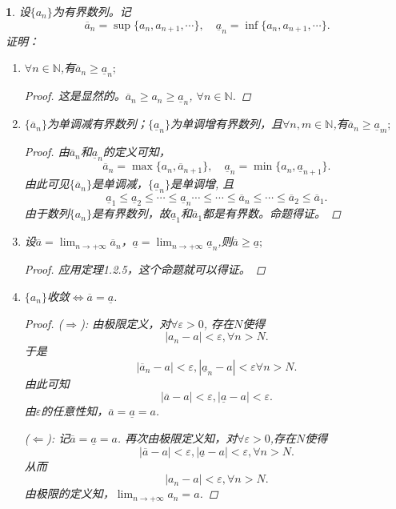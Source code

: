 \documentclass[utf8]{book}
\newtheorem{example}{}[section]             %
\begin{document}
\begin{example}
设$\{a_n\}$为有界数列。记
$$\overline{a}_n = \sup\{a_n, a_{n+1}, \cdots\}, \quad\underline{a}_n= \inf\{a_n, a_{n+1},\cdots\}.$$
证明：
\renewcommand\labelenumi{\normalfont(\theenumi)}
\begin{enumerate}
\item $\forall n\in\mathbb{N}$,有$\overline{a}_n \geq\underline{a}_n;$
\begin{proof}
这是显然的。$\overline{a}_n \geq a_n \geq \underline{a}_n$, $\forall n\in \mathbb{N}$.
\end{proof}
\item $\{\overline{a}_n\}$为单调减有界数列；$\{\underline{a}_n\}$为单调增有界数列，且$\forall n,m\in\mathbb{N}$,有$\overline{a}_n \geq\underline{a}_m;$
\begin{proof}
由$\overline{a}_n$和$\underline{a}_n$的定义可知，
$$\overline{a}_n = \max\{a_n, \overline{a}_{n+1}\}, \quad \underline{a}_n = \min\{a_n, \underline{a}_{n+1}\}.$$
由此可见$\{\overline{a}_n\}$是单调减，$\{\underline{a}_n\}$是单调增, 且
$$\underline{a}_1 \leq \underline{a}_2\leq \cdots\leq \underline{a}_n \cdots \leq \cdots \leq \overline{a}_n \leq \cdots \leq \overline{a}_2 \leq \overline{a}_1.$$
由于数列$\{a_n\}$是有界数列，故$\underline{a}_1$和$\overline{a}_1$都是有界数。命题得证。
\end{proof}
\item 设$\overline{a}=\displaystyle  \lim_{n\to +\infty}\overline{a}_n$，$\underline{a}=\displaystyle  \lim_{n\to +\infty}\underline{a}_n$,则$\overline{a}\geq \underline{a};$
\begin{proof}
应用定理1.2.5，这个命题就可以得证。
\end{proof}
\item $\{a_n\}$收敛$\Leftrightarrow \overline{a}=\underline{a}$.
\begin{proof}
($\Rightarrow$): 由极限定义，对$\forall \varepsilon>0$, 存在$N$使得
$$|a_n-a|<\varepsilon,\forall n>N.$$
于是
$$|\overline{a}_n-a|<\varepsilon, |\underline{a}_n-a|<\varepsilon\forall n>N.$$
由此可知
$$|\overline{a}-a|<\varepsilon, |\underline{a}-a|<\varepsilon.$$
由$\varepsilon$的任意性知，$\overline{a}=\underline{a}=a$.

($\Leftarrow$): 记$\overline{a}=\underline{a}=a$. 再次由极限定义知，对$\forall \varepsilon > 0$,存在$N$使得
$$|\overline{a}- a|<\varepsilon, |\underline{a}-a|<\varepsilon, \forall n> N.$$
从而$$|a_n-a|<\varepsilon,\forall n>N.$$
由极限的定义知，$\displaystyle  \lim_{n\to +\infty}a_n = a$.
\end{proof}
\end{enumerate}
\end{example}
\end{document}
